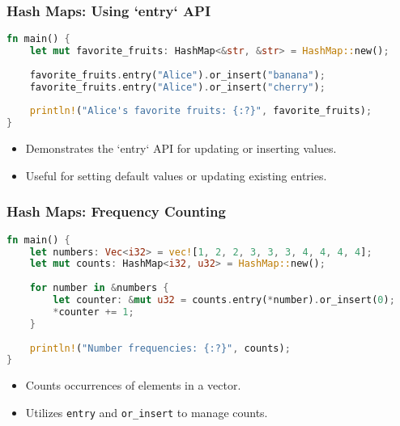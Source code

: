 \documentclass[aspectratio=169, table]{beamer}
\begin{document}
\begin{frame}[fragile]
\frametitle{Hash Maps: Using `entry` API}
\begin{lstlisting}[language=Rust]
fn main() {
	let mut favorite_fruits: HashMap<&str, &str> = HashMap::new();
	
	favorite_fruits.entry("Alice").or_insert("banana");
	favorite_fruits.entry("Alice").or_insert("cherry");
	
	println!("Alice's favorite fruits: {:?}", favorite_fruits);
}
\end{lstlisting}
\begin{itemize}
\item Demonstrates the `entry` API for updating or inserting values.
\item Useful for setting default values or updating existing entries.
\end{itemize}
\end{frame}

\begin{frame}[fragile]
\frametitle{Hash Maps: Frequency Counting}
\begin{lstlisting}[language=Rust]
fn main() {
	let numbers: Vec<i32> = vec![1, 2, 2, 3, 3, 3, 4, 4, 4, 4];
	let mut counts: HashMap<i32, u32> = HashMap::new();
	
	for number in &numbers {
		let counter: &mut u32 = counts.entry(*number).or_insert(0);
		*counter += 1;
	}
	
	println!("Number frequencies: {:?}", counts);
}
\end{lstlisting}
\begin{itemize}
\item Counts occurrences of elements in a vector.
\item Utilizes \texttt{entry} and \texttt{or\_insert} to manage counts.
\end{itemize}
\end{frame}
\end{document}
